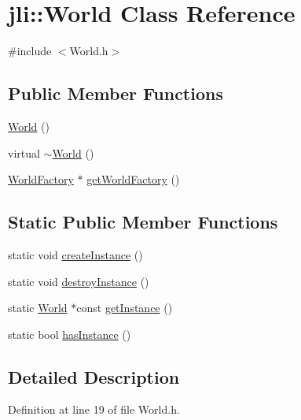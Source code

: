 \hypertarget{classjli_1_1_world}{\section{jli\+:\+:World Class Reference}
\label{classjli_1_1_world}
}


{\ttfamily \#include $<$World.\+h$>$}

\subsection*{Public Member Functions}
\begin{DoxyCompactItemize}
\item 
\hyperlink{classjli_1_1_world_ab340b6a4f69503333397ec65b091414a}{World} ()
\item 
virtual \hyperlink{classjli_1_1_world_a23e1f8b843020bdcec4b3ece3a89d1b8}{$\sim$\+World} ()
\item 
\hyperlink{classjli_1_1_world_factory}{World\+Factory} $\ast$ \hyperlink{classjli_1_1_world_add5ebedf8f6abde2bf680200ab40a680}{get\+World\+Factory} ()
\end{DoxyCompactItemize}
\subsection*{Static Public Member Functions}
\begin{DoxyCompactItemize}
\item 
static void \hyperlink{classjli_1_1_world_a9d8f58d1514737cf00f71aee3ad3c9cd}{create\+Instance} ()
\item 
static void \hyperlink{classjli_1_1_world_a5cd566fc8e6f41ed5d0de5c8f6cbacf8}{destroy\+Instance} ()
\item 
static \hyperlink{classjli_1_1_world}{World} $\ast$const \hyperlink{classjli_1_1_world_af43874b37ad02a3f2f43efdc10ae0282}{get\+Instance} ()
\item 
static bool \hyperlink{classjli_1_1_world_a3e3e98121757b9be15170c9b1f83745d}{has\+Instance} ()
\end{DoxyCompactItemize}


\subsection{Detailed Description}


Definition at line 19 of file World.\+h.



